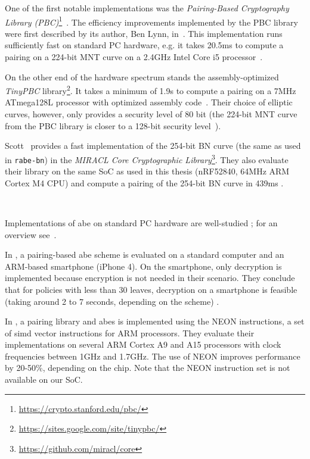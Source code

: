 One of the first notable implementations was the \emph{Pairing-Based Cryptography Library (PBC)}\footnote{\label{footnotepbc}\url{https://crypto.stanford.edu/pbc/}}~\cite{lynn_implementation_2007}. %
The efficiency improvements implemented by the PBC library were first described by its author, Ben Lynn, in~\cite{lynn_implementation_2007}.
This implementation runs sufficiently fast on standard PC hardware, e.g. it takes 20.5ms to compute a pairing on a 224-bit MNT curve on a 2.4GHz Intel Core i5 processor~\cite{akinyele_self-protecting_2010}.

On the other end of the hardware spectrum stands the assembly-optimized \emph{TinyPBC} library\footnote{\url{https://sites.google.com/site/tinypbc/}}.
It takes a minimum of 1.9s to compute a pairing on a 7MHz ATmega128L processor with optimized assembly code~\cite{oliveira_tinypbc_2011}. 
Their choice of elliptic curves, however, only provides a security level of 80 bit (the 224-bit MNT curve from the PBC library is closer to a 128-bit security level~\cite{akinyele_self-protecting_2010}).

Scott~\cite{scott_deployment_2020} provides a fast implementation of the 254-bit BN curve (the same as used in \texttt{rabe-bn}) in the \emph{MIRACL Core Cryptographic Library}\footnote{\url{https://github.com/miracl/core}}.
They also evaluate their library on the same SoC as used in this thesis (nRF52840, 64MHz ARM Cortex M4 CPU) and compute a pairing of the 254-bit BN curve in 439ms \cite[Table~4]{scott_deployment_2020}.

~

Implementations of \acrshort{abe} on standard PC hardware are well-studied \cite{bethencourt_ciphertext-policy_2007,akinyele_charm_2013,green_functional_nodate}; for an overview see~\cite{zickau_applied_2016}.

In \cite{akinyele_self-protecting_2010}, a pairing-based \acrshort{abe} scheme is evaluated on a standard computer and an ARM-based smartphone (iPhone 4). %
On the smartphone, only decryption is implemented because encryption is not needed in their scenario.
They conclude that for policies with less than 30 leaves, decryption on a smartphone is feasible (taking around 2 to 7 seconds, depending on the scheme) \cite{akinyele_self-protecting_2010}.

In \cite{sanchez_neon_2013}, a pairing library and \acrshort{abes} is implemented using the NEON instructions, a set of \acrshort{simd} vector instructions for ARM processors.
They evaluate their implementations on several ARM Cortex A9 and A15 processors with clock frequencies between 1GHz and 1.7GHz.
The use of NEON improves performance by 20-50\%, depending on the chip.
Note that the NEON instruction set is not available on our SoC. %

